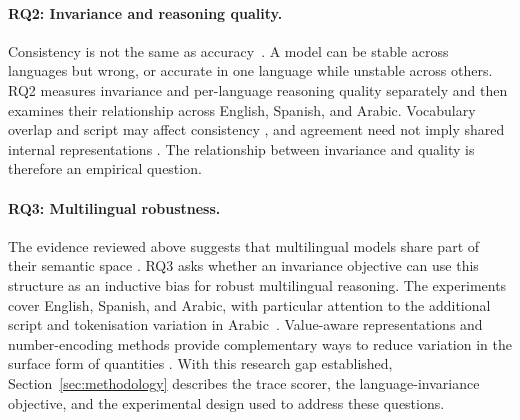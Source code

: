 \paragraph{RQ2: Invariance and reasoning quality.}
Consistency is not the same as accuracy~\cite{elazar2021measuringimprovingconsistencypretrained,
Qi_2023}. A model can be stable across languages but wrong, or accurate in one
language while unstable across others. RQ2 measures invariance and per-language
reasoning quality separately and then examines their relationship across English,
Spanish, and Arabic. Vocabulary overlap and script may affect consistency
\cite{Qi_2023}, and agreement need not imply shared internal representations
\cite{ifergan2024beneathsurfaceconsistencyexploring}. The relationship between
invariance and quality is therefore an empirical question.

\paragraph{RQ3: Multilingual robustness.}
The evidence reviewed above suggests that multilingual models share part of their
semantic space
\cite{wendler2024llamasworkenglishlatent, schut2025multilingualllmsthinkenglish,
conneau2020unsupervisedcrosslingualrepresentationlearning}. RQ3 asks whether an
invariance objective can use this structure as an inductive bias for robust
multilingual reasoning. The experiments cover English, Spanish, and Arabic, with
particular attention to the additional script and tokenisation variation in
Arabic~\cite{reddy2026effectscriptsformatsllm}. Value-aware representations and
number-encoding methods provide complementary ways to reduce variation in the
surface form of quantities
\cite{dutulescu2026valueawarenumericalrepresentationstransformer,
schwartz2024numerologicnumberencodingenhanced}. With this research gap established,
Section~\ref{sec:methodology} describes the trace scorer, the language-invariance objective,
and the experimental design used to address these questions.
